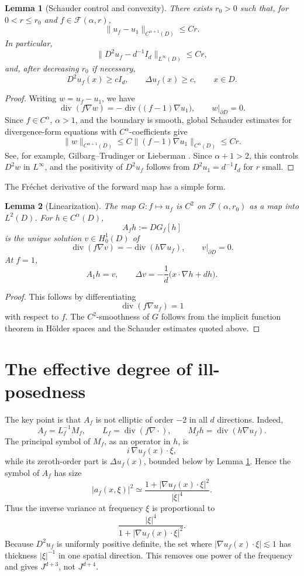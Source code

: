 \documentclass[11pt]{article}
\newtheorem{lemma}{Lemma}
\newcommand{\Div}{\operatorname{div}}
\newcommand{\cF}{\mathcal F}
\begin{document}
\begin{lemma}[Schauder control and convexity]
\label{lem:schauder}
There exists \(r_0>0\) such that, for \(0<r\le r_0\) and \(f\in\cF(\alpha,r)\),
\[
 \|u_f-u_1\|_{C^{\alpha+1}(D)}\le C r.
\]
In particular,
\[
 \|D^2u_f-d^{-1}I_d\|_{L^\infty(D)}\le Cr,
\]
and, after decreasing \(r_0\) if necessary,
\[
 D^2u_f(x)\ge c I_d,\qquad \Delta u_f(x)\ge c,\qquad x\in D.
\]
\end{lemma}

\begin{proof}
Writing \(w=u_f-u_1\), we have
\[
 \Div(f\nabla w)=-\Div\bigl((f-1)\nabla u_1\bigr),\qquad w|_{\partial D}=0.
\]
Since \(f\in C^\alpha\), \(\alpha>1\), and the boundary is smooth, global Schauder estimates for divergence-form equations with \(C^\alpha\)-coefficients give
\[
 \|w\|_{C^{\alpha+1}(D)}
 \le C\|(f-1)\nabla u_1\|_{C^\alpha(D)}
 \le Cr.
\]
See, for example, Gilbarg--Trudinger \cite[Chs. 6,8]{GT} or Lieberman \cite[Ch. 6]{Lieberman}. Since \(\alpha+1>2\), this controls \(D^2w\) in \(L^\infty\), and the positivity of \(D^2u_f\) follows from \(D^2u_1=d^{-1}I_d\) for \(r\) small.
\end{proof}

The Fr\'echet derivative of the forward map has a simple form.

\begin{lemma}[Linearization]
\label{lem:linearization}
The map \(G:f\mapsto u_f\) is \(C^2\) on \(\cF(\alpha,r_0)\) as a map into \(L^2(D)\). For \(h\in C^\alpha(D)\),
\[
 A_fh:=DG_f[h]
\]
is the unique solution \(v\in H^1_0(D)\) of
\[
 \Div(f\nabla v)=-\Div(h\nabla u_f),\qquad v|_{\partial D}=0.
\]
At \(f=1\),
\[
 A_1h=v,\qquad
 \Delta v=-\frac1d\bigl(x\cdot\nabla h+d h\bigr).
\]
\end{lemma}

\begin{proof}
This follows by differentiating
\[
 \Div(f\nabla u_f)=1
\]
with respect to \(f\). The \(C^2\)-smoothness of \(G\) follows from the implicit function theorem in Hölder spaces and the Schauder estimates quoted above.
\end{proof}

\section{The effective degree of ill-posedness}

The key point is that \(A_f\) is not elliptic of order \(-2\) in all \(d\) directions. Indeed,
\[
 A_f=L_f^{-1}M_f,\qquad
 L_f=\Div(f\nabla\cdot),\qquad
 M_fh=\Div(h\nabla u_f).
\]
The principal symbol of \(M_f\), as an operator in \(h\), is
\[
 i\,\nabla u_f(x)\cdot\xi,
\]
while its zeroth-order part is \(\Delta u_f(x)\), bounded below by Lemma \ref{lem:schauder}. Hence the symbol of \(A_f\) has size
\[
 |a_f(x,\xi)|^2
 \simeq
 \frac{1+|\nabla u_f(x)\cdot\xi|^2}{|\xi|^4}.
\]
Thus the inverse variance at frequency \(\xi\) is proportional to
\[
 \frac{|\xi|^4}{1+|\nabla u_f(x)\cdot\xi|^2}.
\]
Because \(D^2u_f\) is uniformly positive definite, the set where
\(|\nabla u_f(x)\cdot\xi|\lesssim1\) has thickness \(|\xi|^{-1}\) in one spatial direction. This removes one power of the frequency and gives \(J^{d+3}\), not \(J^{d+4}\).
\end{document}
